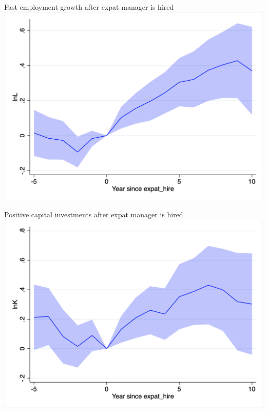 \documentclass[
  ignorenonframetext,
  aspectratio=43,
]{beamer}
\begin{document}
\begin{frame}{Fast employment growth after expat manager is hired}
\protect\hypertarget{fast-employment-growth-after-expat-manager-is-hired}{}
\includegraphics{figure/event_study/expat_hire_lnL.png}
\end{frame}

\begin{frame}{Positive capital investments after expat manager is hired}
\protect\hypertarget{positive-capital-investments-after-expat-manager-is-hired}{}
\includegraphics{figure/event_study/expat_hire_lnK.png}
\end{frame}
\end{document}
